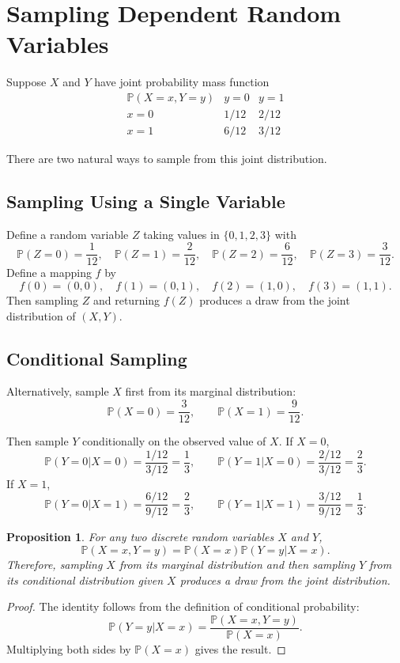 \documentclass[12pt,oneside]{book}
\numberwithin{equation}{section}
\theoremstyle{definition}
\theoremstyle{plain}
\newtheorem{proposition}{Proposition}[section]
\theoremstyle{remark}
\newcommand{\Prob}{\mathbb{P}}
\begin{document}
\section{Sampling Dependent Random Variables}

Suppose $X$ and $Y$ have joint probability mass function
\[
\begin{array}{c|cc}
\Prob(X=x,Y=y) & y=0 & y=1 \\
\hline
x=0 & 1/12 & 2/12 \\
x=1 & 6/12 & 3/12
\end{array}
\]

There are two natural ways to sample from this joint distribution.

\subsection{Sampling Using a Single Variable}

Define a random variable $Z$ taking values in $\{0,1,2,3\}$ with
\[
\Prob(Z=0)=\frac{1}{12}, \quad
\Prob(Z=1)=\frac{2}{12}, \quad
\Prob(Z=2)=\frac{6}{12}, \quad
\Prob(Z=3)=\frac{3}{12}.
\]
Define a mapping $f$ by
\[
f(0)=(0,0), \quad
f(1)=(0,1), \quad
f(2)=(1,0), \quad
f(3)=(1,1).
\]
Then sampling $Z$ and returning $f(Z)$ produces a draw from the joint distribution of $(X,Y)$.

\subsection{Conditional Sampling}

Alternatively, sample $X$ first from its marginal distribution:
\[
\Prob(X=0)=\frac{3}{12}, \qquad
\Prob(X=1)=\frac{9}{12}.
\]

Then sample $Y$ conditionally on the observed value of $X$. If $X=0$,
\[
\Prob(Y=0|X=0)=\frac{1/12}{3/12}=\frac{1}{3},
\qquad
\Prob(Y=1|X=0)=\frac{2/12}{3/12}=\frac{2}{3}.
\]
If $X=1$,
\[
\Prob(Y=0|X=1)=\frac{6/12}{9/12}=\frac{2}{3},
\qquad
\Prob(Y=1|X=1)=\frac{3/12}{9/12}=\frac{1}{3}.
\]

\begin{proposition}
For any two discrete random variables $X$ and $Y$,
\[
\Prob(X=x,Y=y)=\Prob(X=x)\Prob(Y=y|X=x).
\]
Therefore, sampling $X$ from its marginal distribution and then sampling $Y$ from its conditional distribution given $X$ produces a draw from the joint distribution.
\end{proposition}

\begin{proof}
The identity follows from the definition of conditional probability:
\[
\Prob(Y=y|X=x)=\frac{\Prob(X=x,Y=y)}{\Prob(X=x)}.
\]
Multiplying both sides by $\Prob(X=x)$ gives the result.
\end{proof}
\end{document}

